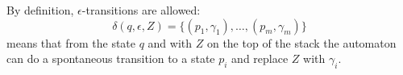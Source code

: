 

\setcounter{section}{6}
\setcounter{subsection}{1}
\setcounter{dfn}{2}


By definition, $\epsilon$-transitions are allowed:
\[
\delta(q, \epsilon, Z) = \{(p_1, \gamma_1), \ldots, (p_m, \gamma_m)\}
\]
means that from the state $q$ and with $Z$ on the top of the stack the automaton can do a spontaneous transition
to a state $p_i$ and replace $Z$ with $\gamma_i$.


